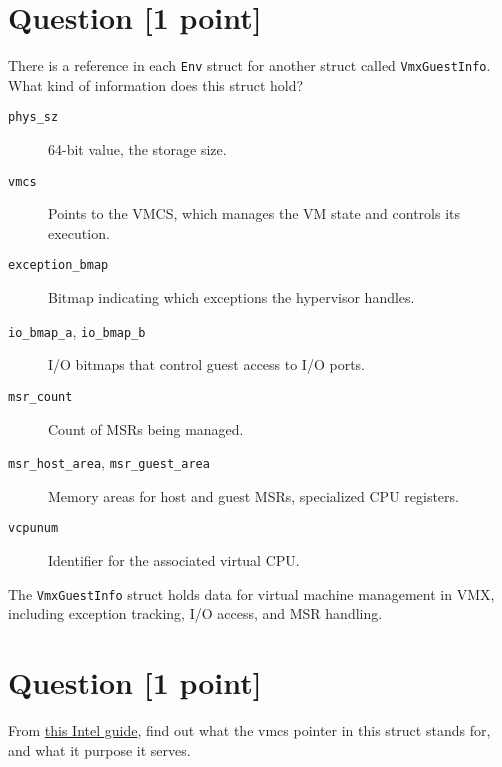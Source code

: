 \documentclass[11pt]{article}
\begin{document}
\section{Question [1 point]}

There is a reference in each \texttt{Env} struct for another struct called \texttt{VmxGuestInfo}. What kind of information does this struct hold?

\begin{solution}

    \begin{description}
        \item[\texttt{phys\_sz}] 64-bit value, the storage size.
        
        \item[\texttt{vmcs}] Points to the VMCS, which manages the VM state and controls its execution.
        
        \item[\texttt{exception\_bmap}] Bitmap indicating which exceptions the hypervisor handles.
        
        \item[\texttt{io\_bmap\_a}, \texttt{io\_bmap\_b}] I/O bitmaps that control guest access to I/O ports.
        
        \item[\texttt{msr\_count}] Count of MSRs being managed.
        
        \item[\texttt{msr\_host\_area}, \texttt{msr\_guest\_area}] Memory areas for host and guest MSRs, specialized CPU registers.
        
        \item[\texttt{vcpunum}] Identifier for the associated virtual CPU.
    \end{description}
    
    The \texttt{VmxGuestInfo} struct holds data for virtual machine management in VMX, including exception tracking, I/O access, and MSR handling.
\end{solution}


\section{Question [1 point]}

From \href{https://www.cs.utexas.edu/~vijay/cs378-f17/projects/64-ia-32-architectures-software-developer-vol-3c-part-3-manual.pdf}{this Intel guide}, find out what the vmcs pointer in this struct stands for, and what it purpose it serves.
\end{document}
